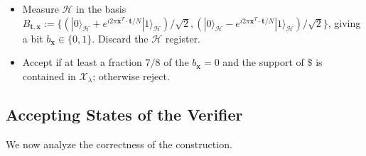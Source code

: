 \documentclass{article}\usepackage[a4paper,margin=20mm]{geometry}
\numberwithin{theorem}{section}
\numberwithin{equation}{section}
\newcommand{\tv}{{\mathbf{t}}}
\newcommand{\xv}{{\mathbf{x}}}
\newcommand{\Hs}{{\mathcal{H}}}
\newcommand{\Xs}{{\mathcal{X}}}
\begin{document}
\begin{construction}
\begin{itemize}
\begin{itemize}
			Since the entries of $\xv$ are bounded by $B$ which is polynomial, this step is efficient. 
			\item Measure $\Hs$ in the basis $B_{\tv,\xv}:=\{(|0\rangle_\Hs+e^{i2\pi \xv^T\cdot\tv/N}|1\rangle_\Hs)/\sqrt{2},(|0\rangle_\Hs-e^{i2\pi \xv^T\cdot\tv/N}|1\rangle_\Hs)/\sqrt{2}\}$, giving a bit $b_\xv\in\{0,1\}$. Discard the $\Hs$ register. 
			\item Accept if at least a fraction $7/8$ of the $b_\xv=0$ and the support of $\$$ is contained in $\Xs_\lambda$; otherwise reject.
		\end{itemize}
	\end{itemize}
\end{construction}

\subsection{Accepting States of the Verifier}

We now analyze the correctness of the construction. 
\end{document}
